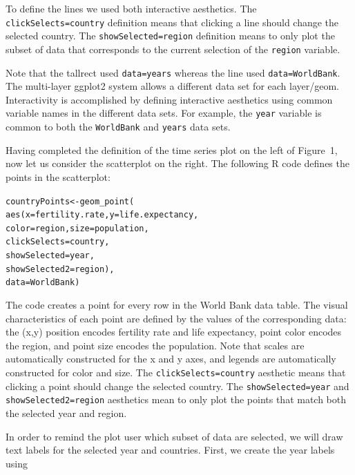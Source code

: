 \documentclass[12pt]{article}\usepackage[]{graphicx}\usepackage[]{color}
\makeatletter
\newcommand{\hlstd}[1]{\textcolor[rgb]{0,0,0}{#1}}%
\newcommand{\hlkwb}[1]{\textcolor[rgb]{0,0,0}{#1}}%
\newcommand{\hlkwc}[1]{\textcolor[rgb]{0,0,1}{#1}}%
\newcommand{\hlkwd}[1]{\textcolor[rgb]{0,0,0}{#1}}%
\newenvironment{kframe}{%
 \def\at@end@of@kframe{}%
 \ifinner\ifhmode%
  \def\at@end@of@kframe{\end{minipage}}%
  \begin{minipage}{\columnwidth}%
 \fi\fi%
 \def\FrameCommand##1{\hskip\@totalleftmargin \hskip-\fboxsep
 \colorbox{shadecolor}{##1}\hskip-\fboxsep
     \hskip-\linewidth \hskip-\@totalleftmargin \hskip\columnwidth}%
 \MakeFramed {\advance\hsize-\width
   \@totalleftmargin\z@ \linewidth\hsize
   \@setminipage}}%
 {\par\unskip\endMakeFramed%
 \at@end@of@kframe}
\newenvironment{knitrout}{}{} %
\makeatother
\begin{document}
To define the lines we used both interactive aesthetics. The
\texttt{clickSelects=country} definition means that clicking a line
should change the selected country. The \texttt{showSelected=region}
definition means to only plot the subset of data that corresponds to
the current selection of the \texttt{region} variable.

Note that the tallrect used \texttt{data=years} whereas the line used
\texttt{data=WorldBank}. The multi-layer ggplot2 system allows a
different data set for each layer/geom. Interactivity is accomplished
by defining interactive aesthetics using common variable names in the
different data sets. For example, the \texttt{year} variable is common
to both the \texttt{WorldBank} and \texttt{years} data sets.

Having completed the definition of the time series plot on the left of
Figure~1, now let us consider the scatterplot on the right. The
following R code defines the points in the scatterplot:

\begin{knitrout}
\color{fgcolor}\begin{kframe}
\begin{alltt}
\hlstd{countryPoints} \hlkwb{<-} \hlkwd{geom_point}\hlstd{(}
    \hlkwd{aes}\hlstd{(}\hlkwc{x}\hlstd{=fertility.rate,} \hlkwc{y}\hlstd{=life.expectancy,}
        \hlkwc{color}\hlstd{=region,} \hlkwc{size}\hlstd{=population,}
        \hlkwc{clickSelects}\hlstd{=country,}
        \hlkwc{showSelected}\hlstd{=year,}
        \hlkwc{showSelected2}\hlstd{=region),}
    \hlkwc{data}\hlstd{=WorldBank)}
\end{alltt}
\end{kframe}
\end{knitrout}

The code creates a point for every row in the World Bank data
table. The visual characteristics of each point are defined by the
values of the corresponding data: the (x,y) position encodes fertility
rate and life expectancy, point color encodes the region, and point
size encodes the population. Note that scales are automatically
constructed for the x and y axes, and legends are automatically
constructed for color and size. The \texttt{clickSelects=country}
aesthetic means that clicking a point should change the selected
country. The \texttt{showSelected=year} and
\texttt{showSelected2=region} aesthetics mean to only plot the points
that match both the selected year and region.

In order to remind the plot user which subset of data are selected, we
will draw text labels for the selected year and countries. First, we
create the year labels using
\end{document}
